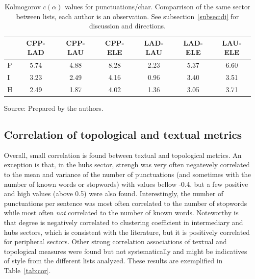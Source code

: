 \begin{table}
  \centering
  \caption{Kolmogorov $c(\alpha)$ values for punctuations/char. Comparrison of the same sector between lists, each author is an observation. See subsection~\ref{subsec:di} for discussion and directions.}
    \small
\setlength{\tabcolsep}{.06667em}
  \begin{tabular}{|l|| c|c|c|c|c|c|}\hline
 & CPP-LAD & CPP-LAU & CPP-ELE & LAD-LAU & LAD-ELE & LAU-ELE \\\hline
P & 5.74 & 4.88 & 8.28 & 2.23 & 5.37 & 6.60 \\\hline
I & 3.23 & 2.49 & 4.16 & 0.96 & 3.40 & 3.51 \\\hline
H & 2.49 & 1.87 & 4.02 & 1.36 & 3.05 & 3.71 \\\hline
  \end{tabular}
\begin{flushleft}
		Source: Prepared by the authors.\
\end{flushleft}
  \label{tab:kolPctInter}
\end{table}




\subsection{Correlation of topological and textual metrics}\label{subsec:cor}


Overall, small correlation is found between textual and topological metrics.
An exception is that, in the hubs sector, strengh was very often negatevely correlated to the mean and variance of the number
of punctuations (and sometimes with the number of known words or stopwords)
with values bellow -0.4, but a few positive and high values (above 0.5) were also found.
Interestingly, the number of punctuations per sentence was most often correlated to the number of stopwords
while most often \emph{not} correlated to the number of known words.
Noteworthy is that degree is negatively correlated to clustering coefficient in intermediary and hubs sectors,
which is consistent with the literature, but it is positively correlated for
peripheral sectors.
Other strong correlation associations of textual and topological measures were found
but not systematically and might be indicatives of style from the different lists analyzed.
These results are exemplified in Table~\ref{tab:cor}.

